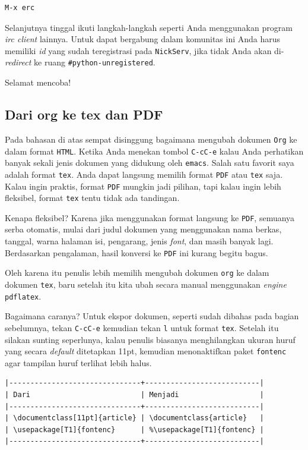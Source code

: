 \documentclass{article}
\begin{document}
\begin{verbatim}
M-x erc
\end{verbatim}

Selanjutnya tinggal ikuti langkah-langkah seperti Anda menggunakan program
\emph{irc client} lainnya. Untuk dapat bergabung dalam komunitas
ini Anda harus memiliki \emph{id} yang sudah teregistrasi pada 
\verb=NickServ=, jika tidak Anda akan di-\emph{redirect} ke ruang
\verb=#python-unregistered=.

Selamat mencoba!

\subsection{Dari org ke tex dan PDF}
Pada bahasan di atas sempat disinggung bagaimana mengubah dokumen \verb=Org=
ke dalam format \verb=HTML=. Ketika Anda menekan tombol \verb=C-cC-e= 
kalau Anda perhatikan banyak sekali jenis dokumen yang didukung 
oleh \verb=emacs=. Salah satu favorit saya adalah format \verb=tex=. 
Anda dapat langsung memilih format \verb=PDF= atau \verb=tex= saja. 
Kalau ingin praktis, format \verb=PDF= mungkin jadi pilihan, tapi kalau 
ingin lebih fleksibel, format \verb=tex= tentu tidak ada tandingan.

Kenapa fleksibel? Karena jika menggunakan format langsung ke \verb=PDF=,
semuanya serba otomatis, mulai dari judul dokumen yang menggunakan nama
berkas, tanggal, warna halaman isi, pengarang, jenis \emph{font}, dan 
masih banyak lagi. Berdasarkan pengalaman, hasil konversi ke \verb=PDF=
ini kurang begitu bagus.

Oleh karena itu penulis lebih memilih mengubah dokumen \verb=org= ke dalam
dokumen \verb=tex=, baru setelah itu kita ubah secara manual menggunakan
\emph{engine} \verb=pdflatex=.

Bagaimana caranya? Untuk ekspor dokumen, seperti sudah dibahas pada bagian
sebelumnya, tekan \verb=C-cC-e= kemudian tekan \verb=l= untuk format 
\verb=tex=. Setelah itu silakan sunting seperlunya, kalau penulis biasanya
menghilangkan ukuran huruf yang secara \emph{default} ditetapkan 11pt,
kemudian menonaktifkan paket \verb=fontenc= agar tampilan huruf terlihat
lebih halus.

\begin{verbatim}
|-------------------------------+---------------------------|
| Dari                          | Menjadi                   |
|-------------------------------+---------------------------|
| \documentclass[11pt]{article} | \documentclass{article}   |
| \usepackage[T1]{fontenc}      | %\usepackage[T1]{fontenc} |
|-------------------------------+---------------------------|
\end{verbatim}
\end{document}
